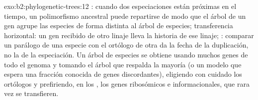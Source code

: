 \begin{solution}{exo:b2:phylogenetic-trees:12}
: cuando dos especiaciones están próximas
en el tiempo, un polimorfismo ancestral puede repartirse de modo que el
árbol de un gen agrupe las especies de forma distinta al árbol de
especies; transferencia horizontal: un gen recibido de otro linaje lleva
la historia de ese linaje; : comparar un parálogo de una
especie con el ortólogo de otra da la fecha de la duplicación, no la de la
especiación. Un árbol de especies se obtiene usando muchos genes de todo
el genoma y tomando el árbol que respalda la mayoría (o un modelo que
espera una fracción conocida de genes discordantes), eligiendo con cuidado
los ortólogos y prefiriendo, en los , los genes ribosómicos e
informacionales, que rara vez se transfieren.
\end{solution}

